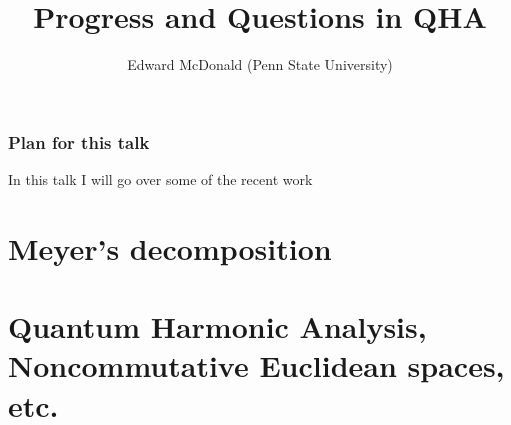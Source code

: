 \documentclass{beamer}
\newcommand\makebeamertitle{\frame{\maketitle}}%
\numberwithin{equation}{section}
\theoremstyle{plain}
\theoremstyle{plain}
\theoremstyle{definition}
\theoremstyle{plain}
\theoremstyle{plain}
\theoremstyle{definition}
\begin{document}
\title[Some recent progress and unanswered questions in Quantum Harmonic Analysis]{Progress and Questions in QHA}


\author[E. McDonald]{Edward McDonald (Penn State University)}



\makebeamertitle

\begin{frame}\frametitle{Plan for this talk}
    In this talk I will go over some of the recent work
\end{frame}

\section{Meyer's decomposition}

\begin{frame}{

\end{frame}

\section{Quantum Harmonic Analysis, Noncommutative Euclidean spaces, etc.}





\begin{frame}
\end{frame}
\end{document}

